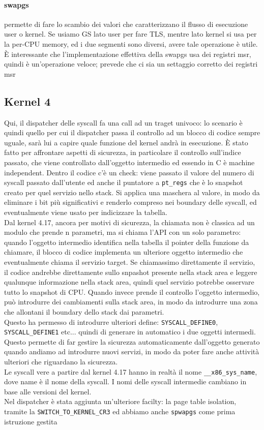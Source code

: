 \documentclass[12pt, oneside]{extbook}
\begin{document}
\paragraph{swapgs} permette di fare lo scambio dei valori che caratterizzano il flusso di esecuzione user o kernel. Se usiamo GS lato user per fare TLS, mentre lato kernel si usa per la per-CPU memory, ed i due segmenti sono diversi, avere tale operazione è utile. È interessante che l'implementazione effettiva della swapgs usa dei registri msr, quindi è un'operazione veloce; prevede che ci sia un settaggio corretto dei registri msr
\subsection{Kernel 4}
Qui, il dispatcher delle syscall fa una call ad un traget univoco: lo scenario è quindi quello per cui il dispatcher passa il controllo ad un blocco di codice sempre uguale, sarà lui a capire quale funzione del kernel andrà in esecuzione. È stato fatto per affrontare aspetti di sicurezza, in particolare il controllo sull'indice passato, che viene controllato dall'oggetto intermedio ed essendo in C è machine independent. Dentro il codice c'è un check: viene passato il valore del numero di syscall passato dall'utente ed anche il puntatore a \texttt{pt\_regs} che è lo snapshot creato per quel servizio nello stack. Si applica una maschera al valore, in modo da eliminare i bit più significativi e renderlo compreso nei boundary delle syscall, ed eventualmente viene usato per indicizzare la tabella.\\ Dal kernel 4.17, ancora per motivi di sicurezza, la chiamata non è classica ad un modulo che prende n parametri, ma si chiama l'API con un solo parametro: quando l'oggetto intermedio identifica nella tabella il pointer della funzione da chiamare, il blocco di codice implementa un ulteriore oggetto intermedio che eventualmente chiama il servizio target. Se chiamassimo direttamente il servizio, il codice andrebbe direttamente sullo snpashot presente nella stack area e leggere qualunque informazione nella stack area, quindi quel servizio potrebbe osservare tutto lo snapshot di CPU. Quando invece prende il controllo l'oggetto intermedio, può introdurre dei cambiamenti sulla stack area, in modo da introdurre una zona che allontani il boundary dello stack dai parametri.\\ Questo ha permesso di introdurre ulteriori define: \texttt{SYSCALL\_DEFINE0}, \texttt{SYSCALL\_DEFINE1} etc... quindi di generare in automatico i due oggetti intermedi. Questo permette di far gestire la sicurezza automaticamente dall'oggetto generato quando andiamo ad introdurre nuovi servizi, in modo da poter fare anche attività ulteriori che riguardano la sicurezza.\\Le syscall vere a partire dal kernel 4.17 hanno in realtà il nome \texttt{\_\_x86\_sys\_name}, dove name è il nome della syscall. I nomi delle syscall intermedie cambiano in base alle versioni del kernel.\\Nel dispatcher è stata aggiunta un'ulteriore facilty: la page table isolation, tramite la \texttt{SWITCH\_TO\_KERNEL\_CR3} ed abbiamo anche \texttt{spwapgs} come prima istruzione gestita 
\end{document}
